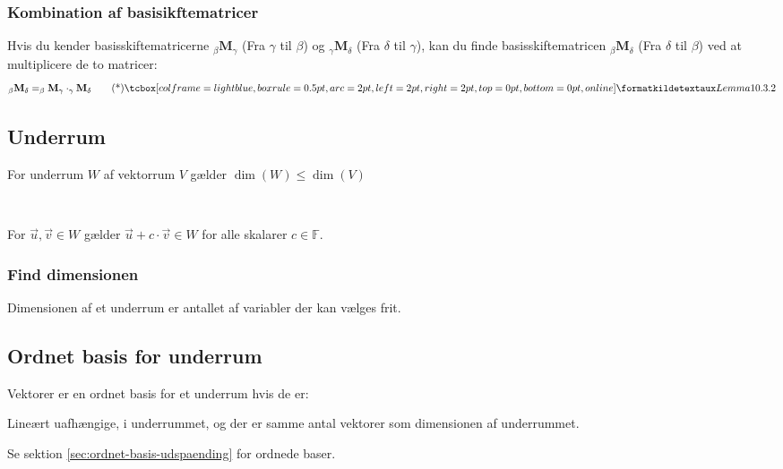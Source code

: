\subsubsection{Kombination af basisikftematricer}
Hvis du kender basisskiftematricerne $_\beta \mathbf{M} _\gamma$ (Fra $\gamma$ til $\beta$) og $_\gamma \mathbf{M} _\delta$ (Fra $\delta$ til $\gamma$), kan du finde basisskiftematricen $_\beta \mathbf{M} _\delta$ (Fra $\delta$ til $\beta$) ved at multiplicere de to matricer:
\[_\beta \mathbf{M} _\delta = _\beta \mathbf{M} _\gamma \cdot _\gamma \mathbf{M} _\delta \kildetag{Lemma 10.3.2}\]

\subsection{Underrum}
For underrum $W$ af vektorrum $V$ gælder $\dim(W) \leq \dim(V)$


\

For $\vec{u}, \vec{v} \in W$ gælder $\vec{u} + c \cdot \vec{v} \in W$ for alle skalarer $c \in \mathbb{F}$.



\subsubsection{Find dimensionen}
Dimensionen af et underrum er antallet af variabler der kan vælges frit.


\subsection{Ordnet basis for underrum}
Vektorer er en ordnet basis for et underrum hvis de er:

Lineært uafhængige, i underrummet, og der er samme antal vektorer som dimensionen af underrummet.

Se sektion \ref{sec:ordnet-basis-udspaending} for ordnede baser.

